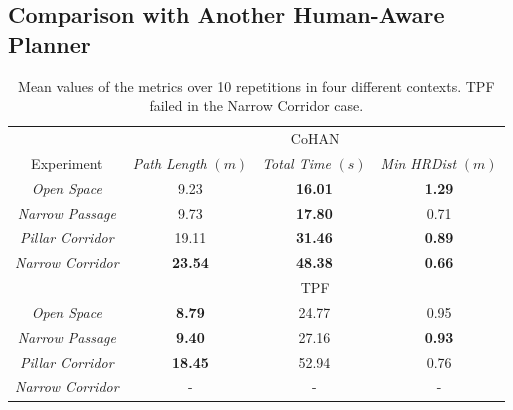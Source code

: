 \subsection{Comparison with Another Human-Aware Planner}
\begin{table}[ht!]
    \centering
    \begin{tabular}{|c|c|c|c|}
    \hline
     & \multicolumn{3}{c|}{CoHAN} \\
    \cline{2-4}
    Experiment & \textit{Path Length} $(m)$ & \textit{Total Time} $(s)$ & \textit{Min  HRDist} $(m)$\\
    \hline
    \textit{Open Space} & 9.23 & \textbf{16.01} & \textbf{1.29} \\
    \hline
    \textit{Narrow Passage} & 9.73 & \textbf{17.80} & 0.71\\ 
    \hline
    \textit{Pillar Corridor} & 19.11 & \textbf{31.46} & \textbf{0.89} \\
    \hline
    \textit{Narrow Corridor} & \textbf{23.54} & \textbf{48.38} & \textbf{0.66}\\
    \hline
    & \multicolumn{3}{c|}{TPF}\\
    \cline{2-4}
    \hline
    \textit{Open Space} & \textbf{8.79} & 24.77 &0.95\\
    \hline
    \textit{Narrow Passage} & \textbf{9.40} & 27.16 & \textbf{0.93}\\
    \hline
    \textit{Pillar Corridor} & \textbf{18.45} & 52.94 & 0.76\\
    \hline
    \textit{Narrow Corridor} & - & - & -\\
    \hline
    \end{tabular}
    \caption{Mean values of the metrics over 10 repetitions in four different contexts. TPF failed in the Narrow Corridor case.}
    \label{results_cohan}
\end{table}

